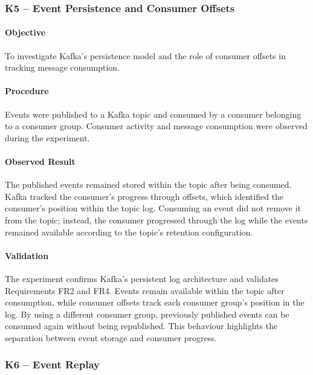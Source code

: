 \documentclass{scrartcl}
\begin{document}
\subsubsection{K5 -- Event Persistence and Consumer Offsets}

\paragraph{Objective}

To investigate Kafka's persistence model and the role of consumer offsets in tracking message consumption.

\paragraph{Procedure}

Events were published to a Kafka topic and consumed by a consumer belonging to a consumer group. Consumer activity and message consumption were observed during the experiment.

\paragraph{Observed Result}

The published events remained stored within the topic after being consumed. Kafka tracked the consumer's progress through offsets, which identified the consumer's position within the topic log. Consuming an event did not remove it from the topic; instead, the consumer progressed through the log while the events remained available according to the topic's retention configuration.
\paragraph{Validation}

The experiment confirms Kafka’s persistent log architecture and validates Requirements FR2 and FR4. Events remain available within the topic after consumption, while consumer offsets track each consumer group’s position in the log. By using a different consumer group, previously published events can be consumed again without being republished. This behaviour highlights the separation between event storage and consumer progress.

\subsubsection{K6 -- Event Replay}
\end{document}
